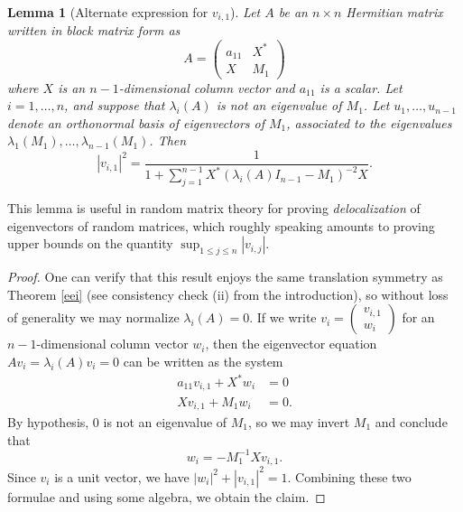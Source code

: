 \documentclass[12pt]{amsart}
\newtheorem{lemma}{Lemma}
\begin{document}
\begin{lemma}[Alternate expression for $v_{i,1}$]\label{vn}  Let $A$ be an $n \times n$ Hermitian matrix written in block matrix form as
$$ A = \begin{pmatrix} a_{11} & X^* \\ X & M_1 \end{pmatrix}$$
where $X$ is an $n-1$-dimensional column vector and $a_{11}$ is a scalar.  Let $i=1,\dots,n$, and suppose that $\lambda_i(A)$ is not an eigenvalue of $M_1$.  Let $u_1,\dots,u_{n-1}$ denote an orthonormal basis of eigenvectors of $M_1$, associated to the eigenvalues $\lambda_1(M_1),\dots,\lambda_{n-1}(M_1)$.  Then
\begin{equation}\label{wts-3}
 |v_{i,1}|^2 = \frac{1}{1 + \sum_{j=1}^{n-1} X^* (\lambda_i(A) I_{n-1} - M_1)^{-2} X}.
\end{equation}
\end{lemma}

This lemma is useful in random matrix theory for proving \emph{delocalization} of eigenvectors of random matrices, which roughly speaking amounts to proving upper bounds on the quantity $\sup_{1 \leq j \leq n} |v_{i,j}|$.

\begin{proof} One can verify that this result enjoys the same translation symmetry as Theorem \ref{eei} (see consistency check (ii) from the introduction), so without loss of generality we may normalize $\lambda_i(A) = 0$.  If we write $v_i = \begin{pmatrix} v_{i,1} \\ w_i \end{pmatrix}$ for an $n-1$-dimensional column vector $w_i$, then the eigenvector equation $A v_i = \lambda_i(A) v_i = 0$ can be written as the system
\begin{align*}
a_{11} v_{i,1} + X^* w_i &= 0 \\
X v_{i,1} + M_1 w_i &= 0.
\end{align*}
By hypothesis, $0$ is not an eigenvalue of $M_1$, so we may invert $M_1$ and conclude that
$$ w_i = - M_1^{-1} X v_{i,1}.$$
Since $v_i$ is a unit vector, we have $|w_i|^2 + |v_{i,1}|^2 = 1$.  Combining these two formulae and using some algebra, we obtain the claim.
\end{proof}
\end{document}
